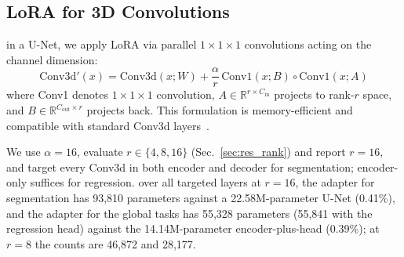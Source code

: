 \iffull\documentclass[journal]{IEEEtran}\else\documentclass[journal,twoside,web]{ieeecolor}\usepackage{generic}\fi
\begin{document}
\subsection{LoRA for 3D Convolutions}
\label{sec:lora}

 in a U-Net, we apply LoRA via parallel $1\times1\times1$ convolutions acting on the channel dimension:
\begin{equation}
\text{Conv3d}'(x) = \text{Conv3d}(x; W) + \frac{\alpha}{r} \, \text{Conv1}(x; B) \circ \text{Conv1}(x; A)
\label{eq:lora3d}
\end{equation}
where Conv1 denotes $1\times1\times1$ convolution, $A \in \mathbb{R}^{r \times C_{\text{in}}}$ projects to rank-$r$ space, and $B \in \mathbb{R}^{C_{\text{out}} \times r}$ projects back. This formulation is memory-efficient and compatible with standard Conv3d layers~\cite{peft}.

We use $\alpha=16$, evaluate $r \in \{4, 8, 16\}$ (Sec.~\ref{sec:res_rank}) and report $r=16$, and target every Conv3d in both encoder and decoder for segmentation; encoder-only suffices for regression.  over all targeted layers at $r=16$, the adapter for segmentation has 93,810 parameters against a 22.58M-parameter U-Net (0.41\%), and the adapter for the global tasks has 55,328 parameters (55,841 with the regression head) against the 14.14M-parameter encoder-plus-head (0.39\%); at $r=8$ the counts are 46,872 and 28,177.
\end{document}
